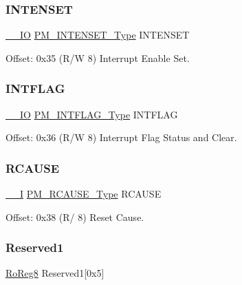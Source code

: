 \subsubsection{\texorpdfstring{INTENSET}{INTENSET}}
{\footnotesize\ttfamily \mbox{\hyperlink{core__cm0plus_8h_aec43007d9998a0a0e01faede4133d6be}{\+\_\+\+\_\+\+IO}} \mbox{\hyperlink{union_p_m___i_n_t_e_n_s_e_t___type}{P\+M\+\_\+\+I\+N\+T\+E\+N\+S\+E\+T\+\_\+\+Type}} I\+N\+T\+E\+N\+S\+ET}



Offset\+: 0x35 (R/W 8) Interrupt Enable Set. 

\mbox{\label{struct_pm_adfa200a3e057054c0adba278ece29454}} 
\subsubsection{\texorpdfstring{INTFLAG}{INTFLAG}}
{\footnotesize\ttfamily \mbox{\hyperlink{core__cm0plus_8h_aec43007d9998a0a0e01faede4133d6be}{\+\_\+\+\_\+\+IO}} \mbox{\hyperlink{union_p_m___i_n_t_f_l_a_g___type}{P\+M\+\_\+\+I\+N\+T\+F\+L\+A\+G\+\_\+\+Type}} I\+N\+T\+F\+L\+AG}



Offset\+: 0x36 (R/W 8) Interrupt Flag Status and Clear. 

\mbox{\label{struct_pm_a983353d43fb468f9c0e21eb89ce7903e}} 
\subsubsection{\texorpdfstring{RCAUSE}{RCAUSE}}
{\footnotesize\ttfamily \mbox{\hyperlink{core__cm0plus_8h_af63697ed9952cc71e1225efe205f6cd3}{\+\_\+\+\_\+I}} \mbox{\hyperlink{union_p_m___r_c_a_u_s_e___type}{P\+M\+\_\+\+R\+C\+A\+U\+S\+E\+\_\+\+Type}} R\+C\+A\+U\+SE}



Offset\+: 0x38 (R/ 8) Reset Cause. 

\mbox{\label{struct_pm_a63b7508a517d1f83bd45a93c1a7f2567}} 
\subsubsection{\texorpdfstring{Reserved1}{Reserved1}}
{\footnotesize\ttfamily \mbox{\hyperlink{group___s_a_m_d21_e15_a__definitions_ga0d957f1433aaf5d70e4dc2b68288442d}{Ro\+Reg8}} Reserved1\mbox{[}0x5\mbox{]}}

